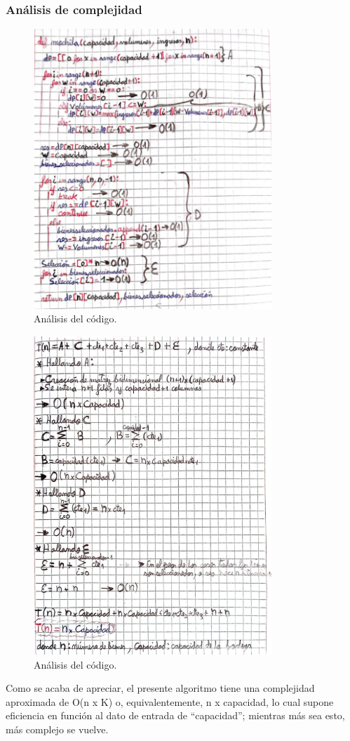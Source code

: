 \subsubsection{Análisis de complejidad}
\begin{figure}[H]
    \centering
    \includegraphics[width=0.8\textwidth]{complejidad_mochila_ejem2.png}
    \caption{Análisis del código.}
    \label{fig:complejidad_ejemplo2}
\end{figure}

\begin{figure}[H]
    \centering
    \includegraphics[width=0.8\textwidth]{complejidad_mochila_ejem2_2.png}
    \caption{Análisis del código.}
    \label{fig:complejidad_ejemplo2_2}
\end{figure}

Como se acaba de apreciar, el presente algoritmo tiene una complejidad aproximada de O(n x K) o, equivalentemente, n x capacidad, lo cual supone eficiencia en función al dato de entrada de “capacidad”; mientras más sea esto, más complejo se vuelve.
